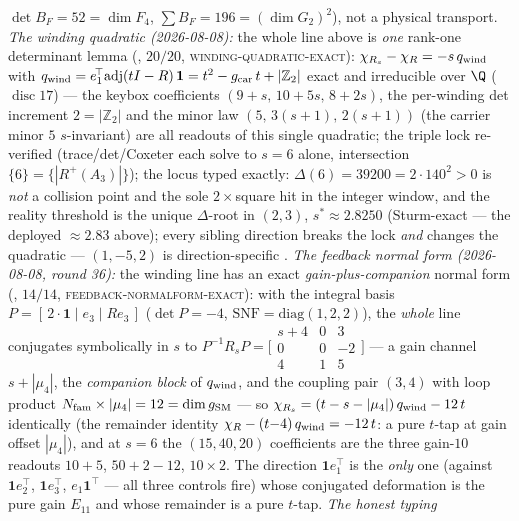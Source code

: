\documentclass[11pt,a4paper]{article}
\newcommand{\gcar}{g_{\mathrm{car}}}
\newcommand{\Nfam}{N_{\mathrm{fam}}}
\newcommand{\Z}{\mathbb{Z}}
\theoremstyle{definition}
\begin{document}
\begin{winbox}
$\det B_F=52=\dim F_4$, $\sum B_F=196=(\dim G_2)^2$), not a physical transport.
\emph{The winding quadratic (2026-08-08):} the whole line above is \emph{one} rank-one determinant lemma
(, $20/20$, \textsc{winding-quadratic-exact}):
$\chi_{R_s} - \chi_R = -s\,q_{\rm wind}$ with
$q_{\rm wind} = e_1^{\!\top}\mathrm{adj}(tI - R)\,\mathbf 1 = t^2 - \gcar\,t + |\Z_2|$
exact and irreducible over $\Q$ ($\operatorname{disc} 17$) --- the keybox coefficients
$(9{+}s,\, 10{+}5s,\, 8{+}2s)$, the per-winding det increment $2 = |\Z_2|$ and the minor law
$(5,\, 3(s{+}1),\, 2(s{+}1))$ (the carrier minor $5$ $s$-invariant) are all readouts of this single
quadratic; the triple lock re-verified (trace/det/Coxeter each solve to $s = 6$ alone, intersection
$\{6\} = \{|R^+(A_3)|\}$); the locus typed exactly: $\Delta(6) = 39200 = 2\cdot140^2 > 0$ is \emph{not} a
collision point and the sole $2{\times}$square hit in the integer window, and the reality threshold is
the unique $\Delta$-root in $(2,3)$, $s^* \approx 2.8250$ (Sturm-exact --- the deployed $\approx 2.83$
above); every sibling direction breaks the lock \emph{and} changes the quadratic --- $(1, -5, 2)$ is
direction-specific \mE.
\emph{The feedback normal form (2026-08-08, round 36):} the winding line has an exact
\emph{gain-plus-companion} normal form (, $14/14$,
\textsc{feedback-normalform-exact}): with the integral basis $P = [\,2\cdot\mathbf 1 \mid e_3 \mid
R e_3\,]$ ($\det P = -4$, $\mathrm{SNF} = \mathrm{diag}(1,2,2)$), the \emph{whole} line conjugates
symbolically in $s$ to $P^{-1} R_s P = \bigl[\begin{smallmatrix} s+4 & 0 & 3\\ 0 & 0 & -2\\ 4 & 1 & 5
\end{smallmatrix}\bigr]$ --- a gain channel $s + |\mu_4|$, the \emph{companion block} of $q_{\rm wind}$,
and the coupling pair $(3,4)$ with loop product $\Nfam \times |\mu_4| = 12 = \dim g_{\rm SM}$ --- so
$\chi_{R_s} = (t - s - |\mu_4|)\,q_{\rm wind} - 12\,t$ identically (the remainder identity
$\chi_R - (t{-}4)\,q_{\rm wind} = -12\,t$: a pure $t$-tap at gain offset $|\mu_4|$), and at $s = 6$ the
$(15, 40, 20)$ coefficients are the three gain-$10$ readouts $10{+}5$, $50{+}2{-}12$, $10\times2$.  The
direction $\mathbf 1 e_1^{\!\top}$ is the \emph{only} one (against $\mathbf 1 e_2^{\!\top}$,
$\mathbf 1 e_3^{\!\top}$, $e_1\mathbf 1^{\!\top}$ --- all three controls fire) whose conjugated
deformation is the pure gain $E_{11}$ and whose remainder is a pure $t$-tap.  \emph{The honest typing
}
\end{winbox}
\end{document}
